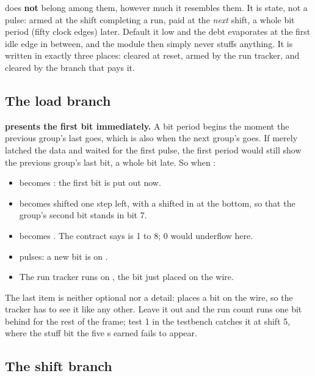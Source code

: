 \begin{warning}
 does \textbf{not} belong among them, however much it resembles them. It is
state, not a pulse: armed at the shift completing a run, paid at the \emph{next} shift, a whole bit
period (fifty clock edges) later. Default it low and the debt evaporates at the first idle edge in
between, and the module then simply never stuffs anything. It is written in exactly three places:
cleared at reset, armed by the run tracker, and cleared by the branch that pays it.
\end{warning}

\subsection{The load branch}
\label{c14:sub:load}

\textbf{ presents the first bit immediately.} A bit period begins the moment the
previous group's last  goes, which is also when the next group's  goes. If
 merely latched the data and waited for the first  pulse, the first period
would still show the previous group's last bit, a whole bit late. So when :
\begin{itemize}
  \item {} becomes : the first bit is put out now.
  \item {} becomes  shifted one step left, with a  shifted in at
    the bottom, so that the group's second bit stands in bit 7.
  \item {} becomes . The contract says  is 1 to 8;
    0 would underflow here.
  \item {} pulses: a new bit is on .
  \item The run tracker runs on , the bit just placed on the wire.
\end{itemize}

The last item is neither optional nor a detail:  places a bit on the wire, so the tracker
has to see it like any other. Leave it out and the run count runs one bit behind for the rest of the
frame; test 1 in the testbench catches it at shift 5, where the stuff bit the five s earned
fails to appear.

\subsection{The shift branch}
\label{c14:sub:shift}

